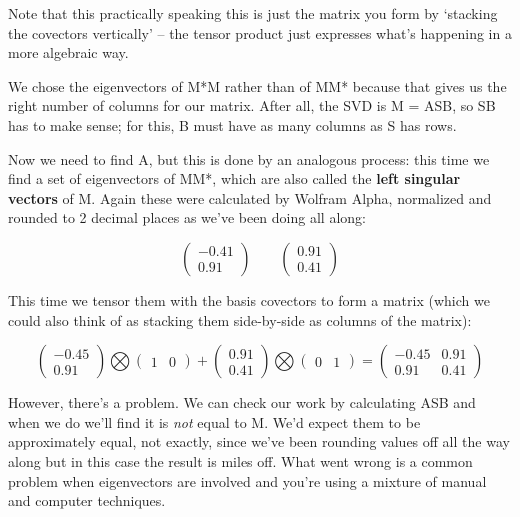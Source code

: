 \documentclass[oneside,english]{amsbook}
\numberwithin{section}{chapter}
\theoremstyle{plain}
\theoremstyle{definition}
\begin{document}
Note that this practically speaking this is just the matrix you form by
`stacking the covectors vertically' -- the tensor product just
expresses what's happening in a more algebraic way.

We chose the eigenvectors of M*M rather than of MM* because that gives
us the right number of columns for our matrix. After all, the SVD is M =
ASB, so SB has to make sense; for this, B must have as many columns as S
has rows.

Now we need to find A, but this is done by an analogous process: this
time we find a set of eigenvectors of MM*, which are also called the
\textbf{left singular vectors} of M. Again these were calculated by
Wolfram Alpha, normalized and rounded to 2 decimal places as we've been
doing all along:

\[\begin{pmatrix}
	- 0.41 \\
	0.91
\end{pmatrix}\ \ \ \ \ \ \ \ \ \begin{pmatrix}
	0.91 \\
	0.41
\end{pmatrix}\]

This time we tensor them with the basis covectors to form a matrix
(which we could also think of as stacking them side-by-side as columns
of the matrix):

\[\begin{pmatrix}
	- 0.45 \\
	0.91
\end{pmatrix}\bigotimes\begin{pmatrix}
	1 & 0
\end{pmatrix} + \begin{pmatrix}
	0.91 \\
	0.41
\end{pmatrix}\bigotimes\begin{pmatrix}
	0 & 1
\end{pmatrix} = \begin{pmatrix}
	- 0.45 & 0.91 \\
	0.91 & 0.41
\end{pmatrix}\]

However, there's a problem. We can check our work by calculating ASB and
when we do we'll find it is \emph{not} equal to M. We'd expect them to
be approximately equal, not exactly, since we've been rounding values
off all the way along but in this case the result is miles off. What
went wrong is a common problem when eigenvectors are involved and you're
using a mixture of manual and computer techniques.
\end{document}
